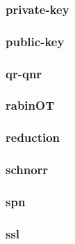 \begin{frame}\frametitle{private-key}
\begin{figure}
\begin{center}

\end{center}
\end{figure}
\end{frame}
\begin{frame}\frametitle{public-key}
\begin{figure}
\begin{center}

\end{center}
\end{figure}
\end{frame}
\begin{frame}\frametitle{qr-qnr}
\begin{figure}
\begin{center}

\end{center}
\end{figure}
\end{frame}
\begin{frame}\frametitle{rabinOT}
\begin{figure}
\begin{center}

\end{center}
\end{figure}
\end{frame}
\begin{frame}\frametitle{reduction}
\begin{figure}
\begin{center}

\end{center}
\end{figure}
\end{frame}
\begin{frame}\frametitle{schnorr}
\begin{figure}
\begin{center}

\end{center}
\end{figure}
\end{frame}
\begin{frame}\frametitle{spn}
\begin{figure}
\begin{center}

\end{center}
\end{figure}
\end{frame}
\begin{frame}\frametitle{ssl}
\begin{figure}
\begin{center}

\end{center}
\end{figure}
\end{frame}
